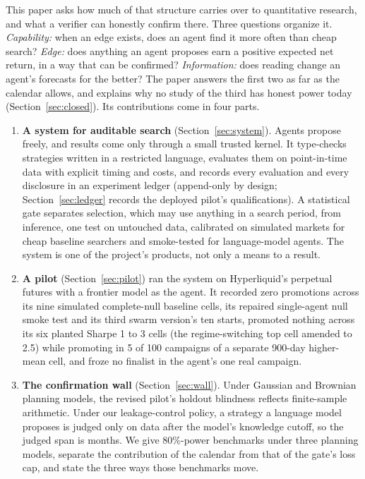 \documentclass[11pt]{article}
\begin{document}
This paper asks how much of that structure carries over to quantitative research, and what a verifier can honestly confirm there. Three questions organize it. \emph{Capability:} when an edge exists, does an agent find it more often than cheap search? \emph{Edge:} does anything an agent proposes earn a positive expected net return, in a way that can be confirmed? \emph{Information:} does reading change an agent's forecasts for the better? The paper answers the first two as far as the calendar allows, and explains why no study of the third has honest power today (Section~\ref{sec:closed}). Its contributions come in four parts.
\begin{enumerate}
  \item \textbf{A system for auditable search} (Section~\ref{sec:system}). Agents propose freely, and results come only through a small trusted kernel. It type-checks strategies written in a restricted language, evaluates them on point-in-time data with explicit timing and costs, and records every evaluation and every disclosure in an experiment ledger (append-only by design; Section~\ref{sec:ledger} records the deployed pilot's qualifications). A statistical gate separates selection, which may use anything in a search period, from inference, one test on untouched data, calibrated on simulated markets for cheap baseline searchers and smoke-tested for language-model agents. The system is one of the project's products, not only a means to a result.
  \item \textbf{A pilot} (Section~\ref{sec:pilot}) ran the system on Hyperliquid's perpetual futures with a frontier model as the agent. It recorded zero promotions across its nine simulated complete-null baseline cells, its repaired single-agent null smoke test and its third swarm version's ten starts, promoted nothing across its six planted Sharpe 1 to 3 cells (the regime-switching top cell amended to 2.5) while promoting in 5 of 100 campaigns of a separate 900-day higher-mean cell, and froze no finalist in the agent's one real campaign.
  \item \textbf{The confirmation wall} (Section~\ref{sec:wall}). Under Gaussian and Brownian planning models, the revised pilot's holdout blindness reflects finite-sample arithmetic. Under our leakage-control policy, a strategy a language model proposes is judged only on data after the model's knowledge cutoff, so the judged span is months. We give 80\%-power benchmarks under three planning models, separate the contribution of the calendar from that of the gate's loss cap, and state the three ways those benchmarks move.

\end{enumerate}
\end{document}
